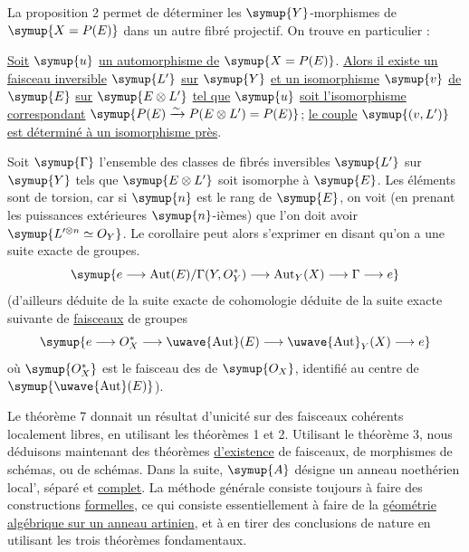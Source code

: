La proposition 2 permet de déterminer les $\symup{Y}$-morphismes de $\symup{X=P(E)}$
dans un autre fibré projectif. On trouve en particulier :

 \uline{Soit} $\symup{u}$ \uline{un automorphisme de} $\symup{X=P(E)}$. \uline{Alors il
existe un faisceau inversible} $\symup{L'}$ \uline{sur} $\symup{Y}$ \uline{et un isomorphisme} $\symup{v}$ \uline{de} $\symup{E}$ \uline{sur}
$\symup{E\otimes L'}$ \uline{tel que} $\symup{u}$ \uline{soit l'isomorphisme correspondant}
$\symup{P(E)\xrightarrow{\sim}P(E\otimes L')=P(E)}$;
\uline{le couple} $\symup{(v,L')}$ \uline{est déterminé à un isomorphisme près}.

Soit $\symup{\Gamma}$ l'ensemble des classes de fibrés inversibles $\symup{L'}$ sur $\symup{Y}$ tels
que $\symup{E\otimes L'}$ soit isomorphe à $\symup{E}$. Les éléments sont de torsion, car si
$\symup{n}$ est le rang de $\symup{E}$, on voit (en prenant les puissances extérieures
$\symup{n}$-ièmes) que l'on doit avoir $\symup{L'^{\otimes n}\simeq O_Y}$. Le corollaire peut
alors s'exprimer en disant qu'on a une suite exacte de groupes.
\[
  \symup{e\longrightarrow
  \operatorname{Aut}(E)/\Gamma(Y,O_Y^*)
  \longrightarrow \operatorname{Aut}_Y(X)
  \longrightarrow \Gamma\longrightarrow e}
\]
(d'ailleurs déduite de la suite exacte de cohomologie déduite de la suite
exacte suivante de \uline{faisceaux} de groupes
\[
  \symup{e\longrightarrow O_X^*
  \longrightarrow \mathop{\text{\uwave{Aut}}}\nolimits(E)
  \longrightarrow \mathop{\text{\uwave{Aut}}}\nolimits_Y(X)
  \longrightarrow e}
\]
où $\symup{O_X^*}$ est le faisceau des  de $\symup{O_X}$, identifié au centre
de $\symup{\mathop{\text{\uwave{Aut}}}\nolimits(E)}$).


Le théorème 7 donnait un résultat d'unicité sur des faisceaux cohérents
localement libres, en utilisant les théorèmes 1 et 2. Utilisant le théorème 3,
nous déduisons maintenant des théorèmes \uline{d'existence} de faisceaux, de morphismes
de schémas, ou de schémas. Dans la suite, $\symup{A}$ désigne un anneau noethérien
local', séparé et \uline{complet}. La méthode générale consiste toujours à faire des
constructions \uline{formelles}, ce qui consiste essentiellement à faire de la
\uline{géométrie algébrique sur un anneau artinien}, et à en tirer des conclusions de
nature  en utilisant les trois théorèmes fondamentaux.

